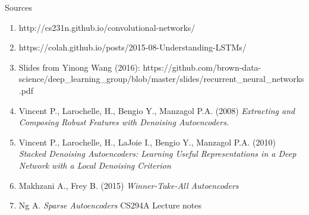 \documentclass[pdf]{beamer}
\begin{document}
\begin{frame}{Sources}

	\begin{enumerate}[1]
	\item http://cs231n.github.io/convolutional-networks/
	\item https://colah.github.io/posts/2015-08-Understanding-LSTMs/
	\item Slides from Yinong Wang (2016): https://github.com/brown-data-science/deep\_learning\_group/blob/master/slides/recurrent\_neural\_networks.pdf
	
	\item Vincent P., Larochelle, H., Bengio Y., Manzagol P.A. (2008) \textit{Extracting and Composing Robust Features with
Denoising Autoencoders}.
	
	\item Vincent P., Larochelle, H., LaJoie I., Bengio Y., Manzagol P.A. (2010) \textit{Stacked Denoising Autoencoders: Learning Useful Representations in a Deep Network with a Local Denoising Criterion}
	
	\item Makhzani A., Frey B. (2015) \textit{Winner-Take-All Autoencoders}
	
	\item Ng A. \textit{Sparse Autoencoders} CS294A Lecture notes
	\end{enumerate}
	

	\end{frame}
\end{document}
